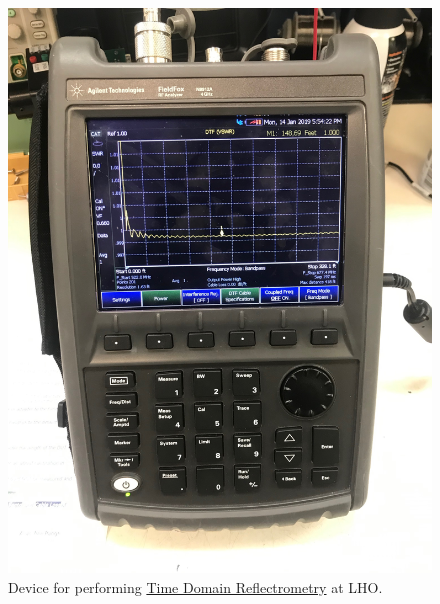 \documentclass{article}
\begin{document}
\begin{figure}[!htb]
	\begin{center}
		\includegraphics[width=0.8\linewidth]{img/time-domain-reflectrometer.jpg}
	\end{center}
	\caption{Device for performing \href{https://en.wikipedia.org/wiki/Time-domain_reflectometer}{Time Domain Reflectrometry} at LHO.}
	\label{fig:tdr-tool}
\end{figure}
\end{document}
